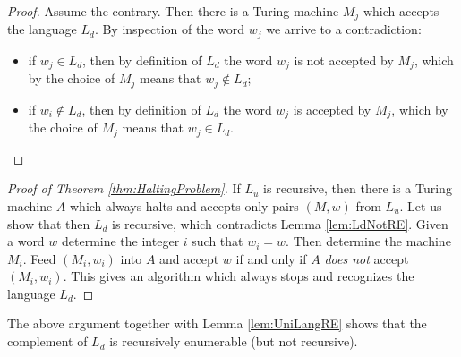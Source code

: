 \begin{page}
\setcounter{section}{8}
\setcounter{subsection}{5}
\setcounter{dfn}{9}
\label{portion:1359}

\begin{proof}
Assume the contrary.
Then there is a Turing machine $M_j$ which accepts the language $L_d$.
By inspection of the word $w_j$ we arrive to a contradiction:
\begin{itemize}
\item
if $w_j \in L_d$, then by definition of $L_d$ the word $w_j$ is not accepted by $M_j$, which by the choice of $M_j$ means that $w_j \notin L_d$;
\item
if $w_i \notin L_d$, then by definition of $L_d$ the word $w_j$ is accepted by $M_j$, which by the choice of $M_j$ means that $w_j \in L_d$.
\end{itemize}
\end{proof}


\begin{proof}[Proof of Theorem \ref{thm:HaltingProblem}]
If $L_u$ is recursive, then there is a Turing machine $A$ which always halts and accepts only pairs $(M, w)$ from $L_u$.
Let us show that then $L_d$ is recursive, which contradicts Lemma \ref{lem:LdNotRE}.
Given a word $w$ determine the integer $i$ such that $w_i = w$.
Then determine the machine $M_i$.
Feed $(M_i, w_i)$ into $A$ and accept $w$ if and only if $A$ \emph{does not} accept $(M_i,w_i)$.
This gives an algorithm which always stops and recognizes the language $L_d$.
\end{proof}


\end{page}

\begin{page}
\setcounter{section}{8}
\setcounter{subsection}{5}
\setcounter{dfn}{10}
\label{portion:1361}

\begin{rem}
The above argument together with Lemma \ref{lem:UniLangRE} shows that
the complement of $L_d$ is recursively enumerable (but not recursive).
\end{rem}

\end{page}


